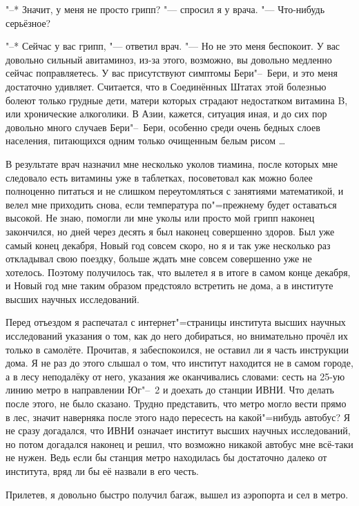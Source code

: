 "--* Значит, у меня не просто грипп? "--- спросил я у врача.
"--- Что-нибудь серьёзное?

"--* Сейчас у вас грипп, "--- ответил врач.
"--- Но не это меня беспокоит.
У вас довольно сильный авитаминоз, из-за этого, возможно, вы довольно медленно
сейчас поправляетесь.
У вас присутствуют симптомы Бери"--~Бери, и это меня достаточно удивляет.
Считается, что в Соединённых Штатах этой болезнью болеют только грудные дети,
матери которых страдают недостатком витамина B, или хронические алкоголики.
В Азии, кажется, ситуация иная, и до сих пор довольно много случаев Бери"--~Бери,
особенно среди очень бедных слоев населения, питающихся одним только очищенным
белым рисом \ldots

В результате врач назначил мне несколько уколов тиамина, после которых мне
следовало есть витамины уже в таблетках, посоветовал как можно более полноценно
питаться и не слишком переутомляться с занятиями математикой, и велел мне
приходить снова, если температура по"=прежнему будет оставаться высокой.
Не знаю, помогли ли мне уколы или просто мой грипп наконец закончился, но дней
через десять я был наконец совершенно здоров.
Был уже самый конец декабря, Новый год совсем скоро, но я и так уже несколько
раз откладывал свою поездку, больше ждать мне совсем совершенно уже не хотелось.
Поэтому получилось так, что вылетел я в итоге в самом конце декабря, и Новый год
мне таким образом предстояло встретить не дома, а в институте высших научных
исследований.

Перед отъездом я распечатал с интернет"=страницы института высших научных
исследований указания о том, как до него добираться, но внимательно прочёл их
только в самолёте.
Прочитав, я забеспокоился, не оставил ли я часть инструкции дома.
Я не раз до этого слышал о том, что институт находится не в самом городе, а в
лесу неподалёку от него, указания же оканчивались словами: сесть на 25-ую линию
метро в направлении Юг"--~2 и доехать до станции ИВНИ.
Что делать после этого, не было сказано.
Трудно представить, что метро могло вести прямо в лес, значит наверняка после
этого надо пересесть на какой"=нибудь автобус?
Я не сразу догадался, что ИВНИ означает институт высших научных исследований,
но потом догадался наконец и решил, что возможно никакой автобус мне всё-таки не
нужен.
Ведь если бы станция метро находилась бы достаточно далеко от института, вряд ли
бы её назвали в его честь.

Прилетев, я довольно быстро получил багаж, вышел из аэропорта и сел в метро.

